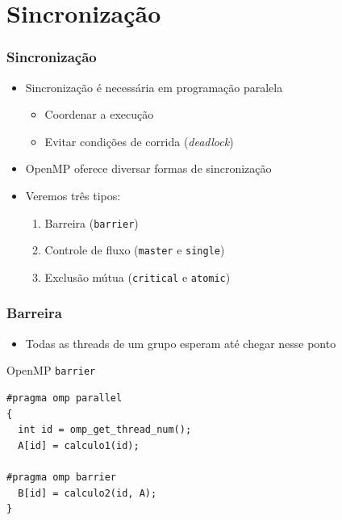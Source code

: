 \documentclass[xcolor={usenames,dvipsnames},12pt,presentation,aspectratio=169]{beamer}
\begin{document}
\section{Sincronização}
\begin{frame}
  \frametitle{Sincronização}
  \begin{itemize}
  \item Sincronização é necessária em programação paralela
    \begin{itemize}
    \item Coordenar a execução
    \item Evitar condições de corrida (\emph{deadlock})
    \end{itemize}
  \pause
  \item OpenMP oferece diversar formas de sincronização
  \item Veremos três tipos:
    \begin{enumerate}[<+->]
    \item Barreira (\texttt{barrier})
    \item Controle de fluxo (\texttt{master} e \texttt{single})
    \item Exclusão mútua (\texttt{critical} e \texttt{atomic})
    \end{enumerate}
  \end{itemize}
\end{frame}
\begin{frame}[fragile]
  \frametitle{Barreira}
  \begin{itemize}
  \item Todas as threads de um grupo esperam até chegar nesse ponto
  \end{itemize}
  \pause
OpenMP \texttt{barrier}
\begin{minipage}{0.95\textwidth}  
  \begin{verbatim}  
#pragma omp parallel
{
  int id = omp_get_thread_num();
  A[id] = calculo1(id);

#pragma omp barrier
  B[id] = calculo2(id, A);
}
\end{verbatim}
\end{minipage}
\end{frame}
\end{document}
